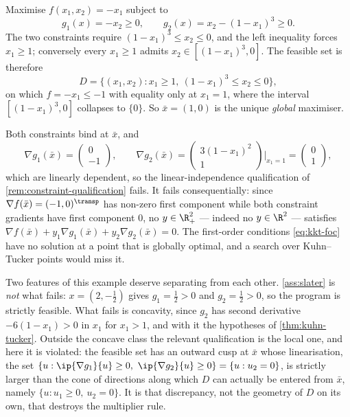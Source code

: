 \begin{eg}\label{eg:cq-failure}
	Maximise $f(x_1,x_2)=-x_1$ subject to
	\[
		g_1(x)=-x_2\geq0,\qquad g_2(x)=x_2-(1-x_1)^3\geq0 .
	\]
	The two constraints require $(1-x_1)^3\leq x_2\leq0$, and the left inequality
	forces $x_1\geq1$; conversely every $x_1\geq1$ admits
	$x_2\in[(1-x_1)^3,0]$. The feasible set is therefore
	\[
		D=\bigl\{(x_1,x_2) : x_1\geq1,\ (1-x_1)^3\leq x_2\leq0\bigr\},
	\]
	on which $f=-x_1\leq-1$ with equality only at $x_1=1$, where the interval
	$[(1-x_1)^3,0]$ collapses to $\{0\}$. So $\bar x=(1,0)$ is the unique
	\emph{global} maximiser.

	Both constraints bind at $\bar x$, and
	\[
		\nabla g_1(\bar x)=\begin{pmatrix}0\\-1\end{pmatrix},\qquad
		\nabla g_2(\bar x)=\begin{pmatrix}3(1-x_1)^2\\1\end{pmatrix}
		\bigg|_{x_1=1}=\begin{pmatrix}0\\1\end{pmatrix},
	\]
	which are linearly dependent, so the linear-independence qualification of
	\autoref{rem:constraint-qualification} fails. It fails consequentially: since
	$\nabla f(\bar x)=(-1,0)^{\transp}$ has non-zero first component while both
	constraint gradients have first component $0$, no $y\in\R^2_+$ --- indeed no
	$y\in\R^2$ --- satisfies $\nabla f(\bar x)+y_1\nabla g_1(\bar x)+
		y_2\nabla g_2(\bar x)=0$. The first-order conditions \eqref{eq:kkt-foc} have no
	solution at a point that is globally optimal, and a search over Kuhn--Tucker
	points would miss it.

	Two features of this example deserve separating from each other.
	\autoref{ass:slater} is \emph{not} what fails: $x=(2,-\tfrac12)$ gives
	$g_1=\tfrac12>0$ and $g_2=\tfrac12>0$, so the program is strictly feasible. What
	fails is concavity, since $g_2$ has second derivative $-6(1-x_1)>0$ in $x_1$ for
	$x_1>1$, and with it the hypotheses of \autoref{thm:kuhn-tucker}. Outside the
	concave class the relevant qualification is the local one, and here it is
	violated: the feasible set has an outward cusp at $\bar x$ whose linearisation,
	the set $\{u : \ip{\nabla g_1}{u}\geq0,\ \ip{\nabla g_2}{u}\geq0\}
		=\{u : u_2=0\}$, is strictly larger than the cone of directions along which
	$D$ can actually be entered from $\bar x$, namely $\{u : u_1\geq0,\ u_2=0\}$. It
	is that discrepancy, not the geometry of $D$ on its own, that destroys the
	multiplier rule.
\end{eg}

